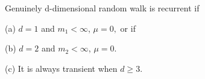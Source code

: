 Genuinely d-dimensional random walk is recurrent if

(a) $d = 1$ and $m_1 < \infty$, $\mu = 0,$ or if

(b) $d = 2$ and $m_2 < \infty$, $\mu = 0.$

(c) It is always transient when $d \geq 3.$